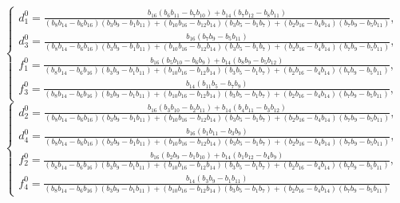 \begin{equation*}
    \begin{cases}
        d_1^0 = \frac{b_{16}(b_{6} b_{11} - b_{7} b_{10}) + b_{14} (b_{7} b_{12} - b_{8} b_{11})}
        {(b_8 b_{14} - b_6 b_{16})(b_3 b_9 - b_1 b_{11}) + (b_{10} b_{16} - b_{12} b_{14}) (b_3 b_5 - b_1 b_7) + (b_2 b_{16} - b_4 b_{14}) (b_7 b_9 - b_5 b_{11})}, \\
        d_3^0 = \frac{b_{16}(b_{7} b_{9} - b_{5} b_{11})}
        {(b_8 b_{14} - b_6 b_{16})(b_3 b_9 - b_1 b_{11}) + (b_{10} b_{16} - b_{12} b_{14}) (b_3 b_5 - b_1 b_7) + (b_2 b_{16} - b_4 b_{14}) (b_7 b_9 - b_5 b_{11})}, \\
        f_1^0 = \frac{b_{16}(b_{5} b_{10} - b_{6} b_{9}) + b_{14}(b_{8} b_{9} - b_{5} b_{12})}
        {(b_8 b_{14} - b_6 b_{16})(b_3 b_9 - b_1 b_{11}) + (b_{10} b_{16} - b_{12} b_{14}) (b_3 b_5 - b_1 b_7) + (b_2 b_{16} - b_4 b_{14}) (b_7 b_9 - b_5 b_{11})}, \\
        f_3^0 = \frac{b_{14}(b_{11} b_{5} - b_{7} b_{9})}
        {(b_8 b_{14} - b_6 b_{16})(b_3 b_9 - b_1 b_{11}) + (b_{10} b_{16} - b_{12} b_{14}) (b_3 b_5 - b_1 b_7) + (b_2 b_{16} - b_4 b_{14}) (b_7 b_9 - b_5 b_{11})},
    \end{cases}
\end{equation*}
\begin{equation*}
    \begin{cases}
        d_2^0 = \frac{b_{16}(b_{3} b_{10} - b_{2} b_{11}) + b_{14}(b_{4} b_{11} - b_{3} b_{12})}
        {(b_8 b_{14} - b_6 b_{16})(b_3 b_9 - b_1 b_{11}) + (b_{10} b_{16} - b_{12} b_{14}) (b_3 b_5 - b_1 b_7) + (b_2 b_{16} - b_4 b_{14}) (b_7 b_9 - b_5 b_{11})}, \\
        d_4^0 = \frac{b_{16}(b_{1} b_{11} - b_{3} b_{9})}
        {(b_8 b_{14} - b_6 b_{16})(b_3 b_9 - b_1 b_{11}) + (b_{10} b_{16} - b_{12} b_{14}) (b_3 b_5 - b_1 b_7) + (b_2 b_{16} - b_4 b_{14}) (b_7 b_9 - b_5 b_{11})}, \\
        f_2^0 = \frac{b_{16}(b_{2} b_{9} - b_{1} b_{10}) + b_{14}(b_{1} b_{12} - b_{4} b_{9})}
        {(b_8 b_{14} - b_6 b_{16})(b_3 b_9 - b_1 b_{11}) + (b_{10} b_{16} - b_{12} b_{14}) (b_3 b_5 - b_1 b_7) + (b_2 b_{16} - b_4 b_{14}) (b_7 b_9 - b_5 b_{11})}, \\
        f_4^0 = \frac{b_{14}(b_{3} b_{9} - b_{1} b_{11})}
        {(b_8 b_{14} - b_6 b_{16})(b_3 b_9 - b_1 b_{11}) + (b_{10} b_{16} - b_{12} b_{14}) (b_3 b_5 - b_1 b_7) + (b_2 b_{16} - b_4 b_{14}) (b_7 b_9 - b_5 b_{11})}
    \end{cases}
\end{equation*}
